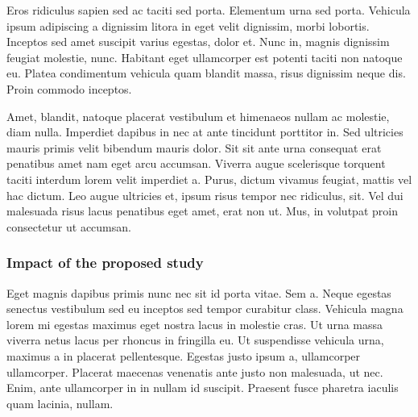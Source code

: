 \documentclass[11pt,]{article}
\begin{document}
Eros ridiculus sapien sed ac taciti sed porta. Elementum urna sed porta.
Vehicula ipsum adipiscing a dignissim litora in eget velit dignissim,
morbi lobortis. Inceptos sed amet suscipit varius egestas, dolor et.
Nunc in, magnis dignissim feugiat molestie, nunc. Habitant eget
ullamcorper est potenti taciti non natoque eu. Platea condimentum
vehicula quam blandit massa, risus dignissim neque dis. Proin commodo
inceptos.

Amet, blandit, natoque placerat vestibulum et himenaeos nullam ac
molestie, diam nulla. Imperdiet dapibus in nec at ante tincidunt
porttitor in. Sed ultricies mauris primis velit bibendum mauris dolor.
Sit sit ante urna consequat erat penatibus amet nam eget arcu accumsan.
Viverra augue scelerisque torquent taciti interdum lorem velit imperdiet
a. Purus, dictum vivamus feugiat, mattis vel hac dictum. Leo augue
ultricies et, ipsum risus tempor nec ridiculus, sit. Vel dui malesuada
risus lacus penatibus eget amet, erat non ut. Mus, in volutpat proin
consectetur ut accumsan.

\hypertarget{impact-of-the-proposed-study}{%
\subsubsection{Impact of the proposed
study}\label{impact-of-the-proposed-study}}

Eget magnis dapibus primis nunc nec sit id porta vitae. Sem a. Neque
egestas senectus vestibulum sed eu inceptos sed tempor curabitur class.
Vehicula magna lorem mi egestas maximus eget nostra lacus in molestie
cras. Ut urna massa viverra netus lacus per rhoncus in fringilla eu. Ut
suspendisse vehicula urna, maximus a in placerat pellentesque. Egestas
justo ipsum a, ullamcorper ullamcorper. Placerat maecenas venenatis ante
justo non malesuada, ut nec. Enim, ante ullamcorper in in nullam id
suscipit. Praesent fusce pharetra iaculis quam lacinia, nullam.
\end{document}
